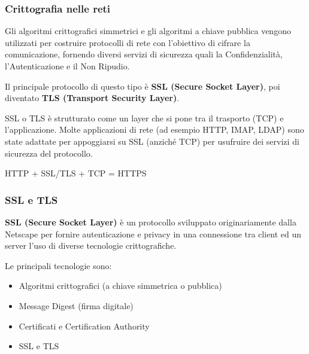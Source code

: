         \subsubsection{Crittografia nelle reti}
            Gli algoritmi crittografici simmetrici e gli algoritmi a chiave pubblica vengono utilizzati per costruire protocolli di rete con l'obiettivo di cifrare la comunicazione, fornendo diversi servizi di sicurezza quali la Confidenzialità, l'Autenticazione e il Non Ripudio.
        
            Il principale protocollo di questo tipo è \textbf{SSL (Secure Socket Layer)}, poi diventato \textbf{TLS (Transport Security Layer)}.
        
            SSL o TLS è strutturato come un layer che si pone tra il trasporto (TCP) e l'applicazione. Molte applicazioni di rete (ad esempio HTTP, IMAP, LDAP) sono state adattate per appoggiarsi su SSL (anziché TCP) per usufruire dei servizi di sicurezza del protocollo.

            

            \begin{center}
                HTTP + SSL/TLS + TCP = HTTPS
            \end{center}

        \subsubsection{SSL e TLS}
            \textbf{SSL (Secure Socket Layer)} è un protocollo sviluppato originariamente dalla Netscape per fornire autenticazione e privacy in una connessione tra client ed un server l'uso di diverse tecnologie crittografiche.
        
            Le principali tecnologie sono:
            \begin{itemize}
                \item Algoritmi crittografici (a chiave simmetrica o pubblica)
                \item Message Digest (firma digitale)
                \item Certificati e Certification Authority
                \item SSL e TLS
            \end{itemize}

